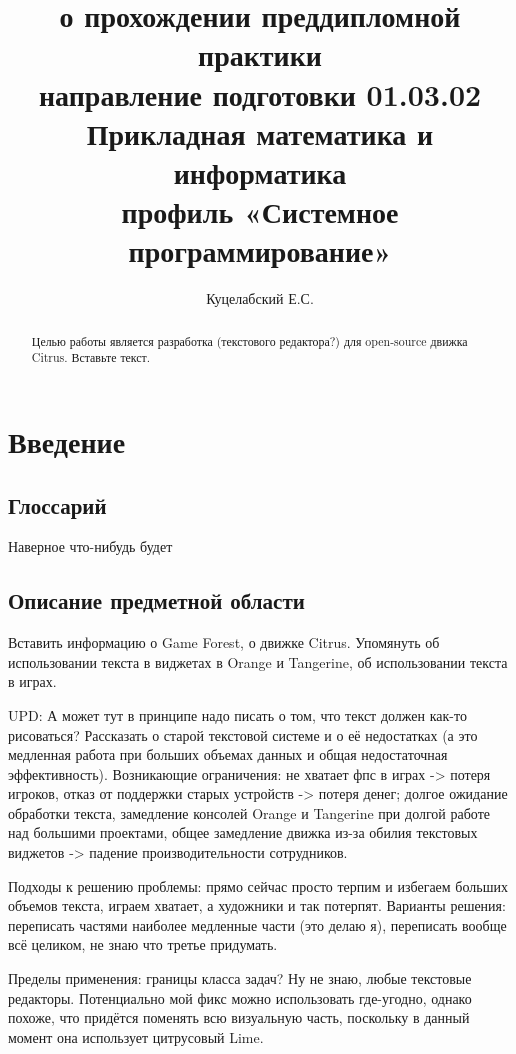 \documentclass{fefu}
\begin{document}
	\title{о прохождении преддипломной практики\\направление подготовки 01.03.02 Прикладная математика и информатика\\профиль «Системное программирование»}
	\author{Куцелабский Е.С.}
	
	\makereporttitle
	\tableofcontents
	\newpage
	
	\begin{abstract}
		Целью работы является разработка (текстового редактора?) для open-source движка Citrus. Вставьте текст.
	\end{abstract}

	\section{Введение}
	\subsection{Глоссарий}
	Наверное что-нибудь будет		
	\subsection{Описание предметной области}
	\par Вставить информацию о Game Forest, о движке Citrus. Упомянуть об использовании текста в виджетах в Orange и Tangerine, об использовании текста в играх.	
	\par UPD: А может тут в принципе надо писать о том, что текст должен как-то рисоваться?
	Рассказать о старой текстовой системе и о её недостатках (а это медленная работа при больших объемах данных и общая недостаточная эффективность). Возникающие ограничения: не хватает фпс в играх -> потеря игроков, отказ от поддержки старых устройств -> потеря денег; долгое ожидание обработки текста, замедление консолей Orange и Tangerine при долгой работе над большими проектами, общее замедление движка из-за обилия текстовых виджетов -> падение производительности сотрудников.	
	\par Подходы к решению проблемы: прямо сейчас просто терпим и избегаем больших объемов текста, играем хватает, а художники и так потерпят. Варианты решения: переписать частями наиболее медленные части (это делаю я), переписать вообще всё целиком, не знаю что третье придумать.
	\par Пределы применения: границы класса задач? Ну не знаю, любые текстовые редакторы. Потенциально мой фикс можно использовать где-угодно, однако похоже, что придётся поменять всю визуальную часть, поскольку в данный момент она использует цитрусовый Lime.		
\end{document}
